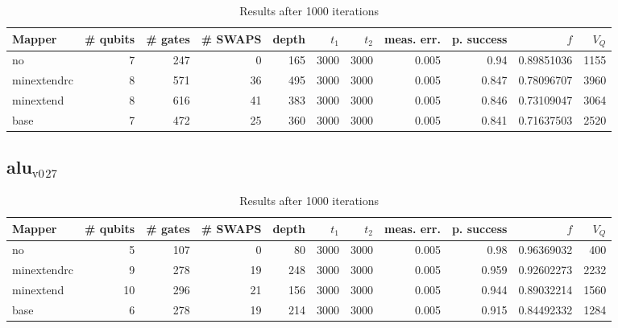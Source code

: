 \documentclass[11pt]{article}
\begin{document}
\begin{table}[!htpb]
\caption{\label{tab:orgc1b1f29}
Results after 1000 iterations}
\centering
\begin{tabular}{lrrrrrrrrrr}
\hline
Mapper & \# qubits & \# gates & \# SWAPS & depth & \(t_1\) & \(t_2\) & meas. err. & p. success & \(f\) & \(V_Q\)\\
\hline
no & 7 & 247 & 0 & 165 & 3000 & 3000 & 0.005 & 0.94 & 0.89851036 & 1155\\
\hline
minextendrc & 8 & 571 & 36 & 495 & 3000 & 3000 & 0.005 & 0.847 & 0.78096707 & 3960\\
minextend & 8 & 616 & 41 & 383 & 3000 & 3000 & 0.005 & 0.846 & 0.73109047 & 3064\\
base & 7 & 472 & 25 & 360 & 3000 & 3000 & 0.005 & 0.841 & 0.71637503 & 2520\\
\hline
\end{tabular}
\end{table}

\subsection{alu\(_{\text{v0}}\)\(_{\text{27}}\)}
\label{sec:org894e89e}
\begin{table}[!htpb]
\caption{\label{tab:org106d352}
Results after 1000 iterations}
\centering
\begin{tabular}{lrrrrrrrrrr}
\hline
Mapper & \# qubits & \# gates & \# SWAPS & depth & \(t_1\) & \(t_2\) & meas. err. & p. success & \(f\) & \(V_Q\)\\
\hline
no & 5 & 107 & 0 & 80 & 3000 & 3000 & 0.005 & 0.98 & 0.96369032 & 400\\
\hline
minextendrc & 9 & 278 & 19 & 248 & 3000 & 3000 & 0.005 & 0.959 & 0.92602273 & 2232\\
minextend & 10 & 296 & 21 & 156 & 3000 & 3000 & 0.005 & 0.944 & 0.89032214 & 1560\\
base & 6 & 278 & 19 & 214 & 3000 & 3000 & 0.005 & 0.915 & 0.84492332 & 1284\\
\hline
\end{tabular}
\end{table}
\end{document}
